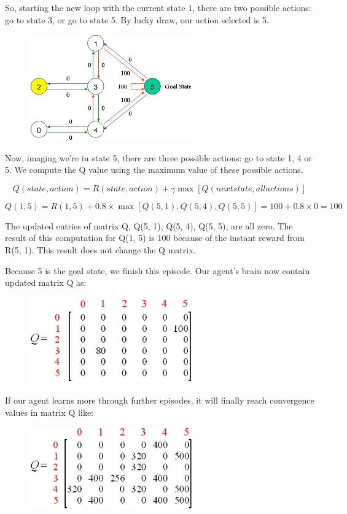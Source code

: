 \documentclass[a4paper, 11pt]{article}
\begin{document}
So, starting the new loop with the current state 1, there are two possible actions: go to state 3, or go to state 5.  By lucky draw, our action selected is 5.

\begin{figure}[H]
\centering
\includegraphics[width=7cm]{fig/map3a}
\end{figure}

Now, imaging we're in state 5, there are three possible actions: go to state 1, 4 or 5.  We compute the Q value using the maximum value of these possible actions.

$$Q(state, action) = R(state, action) + \gamma\max[Q(next state, all actions)]$$

$$Q(1, 5) = R(1, 5) + 0.8 \times\max[Q(5, 1), Q(5, 4), Q(5, 5)] = 100 + 0.8\times0 = 100$$

The updated entries of matrix Q, Q(5, 1), Q(5, 4), Q(5, 5), are all zero.  The result of this computation for Q(1, 5) is 100 because of the instant reward from R(5, 1).  This result does not change the Q matrix.

Because 5 is the goal state, we finish this episode.  Our agent's brain now contain updated matrix Q as:

\begin{figure}[H]
\centering
\includegraphics[width=7cm]{fig/q_matrix3}
\end{figure}

If our agent learns more through further episodes, it will finally reach convergence values in matrix Q like:

\begin{figure}[H]
\centering
\includegraphics[width=7cm]{fig/q_matrix4}
\end{figure}
\end{document}
